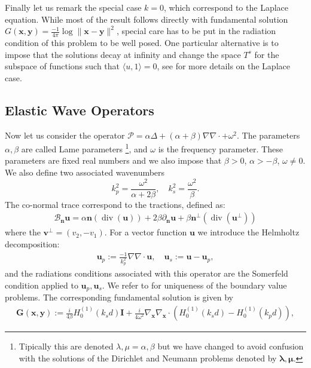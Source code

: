 \documentclass{article}
\renewcommand{\div}{\operatorname{div}}
\newcommand{\bmu} {\bm{\mu}}
\renewcommand{\div}{{\rm div}}
\renewcommand{\div}{\operatorname{div}}
\newcommand{\cP}{\mathcal{P}}
\newcommand{\bla}{\boldsymbol \lambda}
\newcommand{\bn}{\bm{n}}
\newcommand{\bu}{\bm{u}}
\newcommand{\bx}{\bm{x}}
\newcommand{\by}{\bm{y}}
\begin{document}
Finally let us remark the special case $k=0$, which correspond to the Laplace equation. While most of the result follows directly with fundamental solution $G(\bx,\by) = \frac{-1}{4\pi} \log \| \bx - \by \|^2$, special care has to be put in the radiation condition of this problem to be well posed. One particular alternative is to impose that the solutions decay at infinity and change the space $T^s$ for the subspace of functions such that $\langle u, 1 \rangle = 0$, see \cite{stephan1984augmented,JHP20} for more details on the Laplace case. 
\subsection{Elastic Wave Operators}

Now let us consider the operator $\cP = \alpha \Delta + (\alpha + \beta) \nabla \nabla \cdot + \omega^2$. The parameters $\alpha,\beta$ are called Lame parameters \footnote{Tipically this are denoted $\lambda, \mu = \alpha, \beta$ but we have changed to avoid confusion with the solutions of the Dirichlet and Neumann problems denoted by $\bla, \bmu$.}, and $\omega$ is the frequency parameter. These parameters are  fixed real numbers and we also impose that  $\beta > 0$, $\alpha > - \beta$, $\omega \neq 0$. We also define two associated wavenumbers $$
k_p^2 = \frac{\omega^2}{\alpha+2\beta}, \quad
k_s^2 = \frac{\omega^2}{\beta}.$$  
The co-normal trace correspond to the tractions, defined as: 
\begin{align*}
\mathcal{B}_{\bn} \mathbf{u} =
\alpha \mathbf{n} (\div(\mathbf{u}))
+ 2 \beta \partial_{\mathbf{n}} \mathbf{u}+
\beta  \mathbf{n}^\perp (\div(\mathbf{u}^\perp))
\end{align*}
where the $\mathbf{v}^\perp  = (v_2,-v_1)$. For a vector function $\bu$ we introduce the Helmholtz decomposition: 
\begin{align*}
\mathbf{u}_p := \frac{-1}{k^2_p}\nabla \nabla \cdot \mathbf{u}, \quad
\mathbf{u}_s := \mathbf{u} - \mathbf{u}_p,
\end{align*} 
and the radiations conditions associated with this operator are the Somerfeld condition applied to $\bu_p, \bu_s$. We refer to \cite{kress1996} for uniqueness of the boundary value problems. 
The corresponding fundamental solution is given by 
\begin{align}
\label{eq:efunsol}
\mathbf{G} (\mathbf{x}, \mathbf{y}) := 
\frac{i}{4 \beta} H^{(1)}_0(k_s d)\mathbf{I}+ \frac{i}{4\omega^2} \nabla_\mathbf{x} 
\nabla_\mathbf{x} \cdot \left( 
H^{(1)}_0(k_sd ) - H^{(1)}_0(k_p d)
\right),
\end{align}
\end{document}
